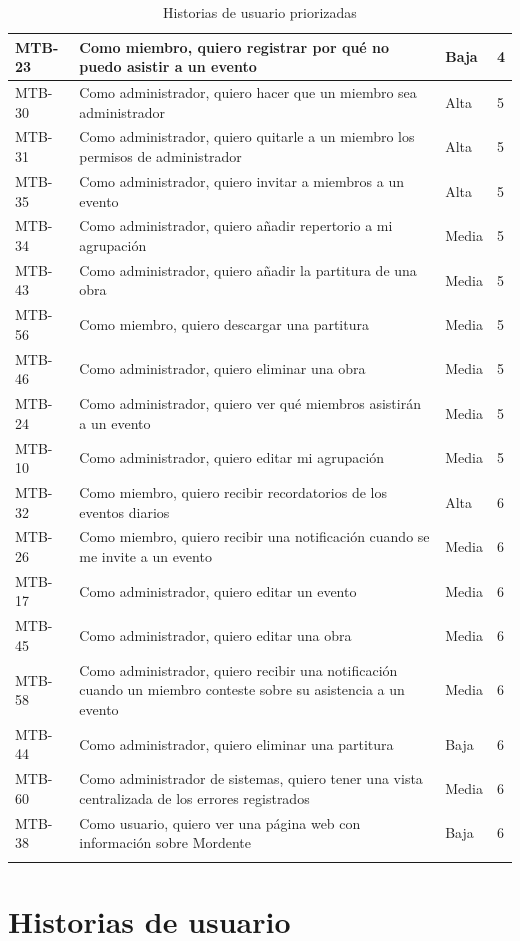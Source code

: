 \begin{longtable}{| p{} | p{} | p{} | p{} |}
MTB-23 & Como miembro, quiero registrar por qué no puedo asistir a un evento & Baja & 4 \\ \hline
MTB-30 & Como administrador, quiero hacer que un miembro sea administrador & Alta & 5 \\ \hline
MTB-31 & Como administrador, quiero quitarle a un miembro los permisos de administrador & Alta & 5 \\ \hline
MTB-35 & Como administrador, quiero invitar a miembros a un evento & Alta & 5 \\ \hline
MTB-34 & Como administrador, quiero añadir repertorio a mi agrupación & Media & 5 \\ \hline
MTB-43 & Como administrador, quiero añadir la partitura de una obra & Media & 5 \\ \hline
MTB-56 & Como miembro, quiero descargar una partitura & Media & 5 \\ \hline
MTB-46 & Como administrador, quiero eliminar una obra & Media & 5 \\ \hline
MTB-24 & Como administrador, quiero ver qué miembros asistirán a un evento & Media & 5 \\ \hline
MTB-10 & Como administrador, quiero editar mi agrupación & Media & 5 \\ \hline
MTB-32 & Como miembro, quiero recibir recordatorios de los eventos diarios & Alta & 6 \\ \hline
MTB-26 & Como miembro, quiero recibir una notificación cuando se me invite a un evento & Media & 6 \\ \hline
MTB-17 & Como administrador, quiero editar un evento & Media & 6 \\ \hline
MTB-45 & Como administrador, quiero editar una obra & Media & 6 \\ \hline
MTB-58 & Como administrador, quiero recibir una notificación cuando un miembro conteste sobre su asistencia a un evento & Media & 6 \\ \hline
MTB-44 & Como administrador, quiero eliminar una partitura & Baja & 6 \\ \hline
MTB-60 & Como administrador de sistemas, quiero tener una vista centralizada de los errores registrados & Media & 6 \\ \hline
MTB-38 & Como usuario, quiero ver una página web con información sobre Mordente & Baja & 6 \\ \hline
\caption{Historias de usuario priorizadas}
\label{tab:historiasPriorizadas}
\end{longtable}


\section{Historias de usuario}

